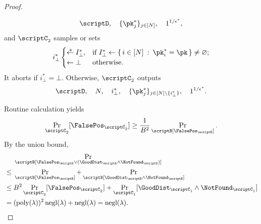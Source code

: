 \begin{proof}
\begin{itemize}
\begin{align*}
\scriptD,\quad
\{\pk_j^\ast\}_{j\in[N]},\quad
1^{1/\epsilon^\ast},
\end{align*}
and $\scriptC_2$ samples or sets
\begin{align*}
i_\bot^\ast\begin{cases}
\draws I_\bot^\ast,&\textup{if }
I_\bot^\ast\gets
\{\,
{i\in[N]}
\::\:
{\pk_i^\ast=\pk}
\,\}\neq\varnothing;\\
\gets\bot&\textup{otherwise}.
\end{cases}
\end{align*}
It aborts if ${i_\bot^\ast=\bot}$.
Otherwise, $\scriptC_2$ outputs
\begin{align*}
\scriptD,\quad
N,\quad
i_\bot^\ast,\quad
\{\pk_j^\ast\}_{j\in{[N]\setminus{\{i_\bot^\ast\}}}},\quad
1^{1/\epsilon^\ast}.
\end{align*}
\end{itemize}
Routine calculation yields
\begin{align*}
\Pr_{\scriptC_2}[\FalsePos_{\scriptC_2}]
\geq\frac{1}{B^2}\Pr_\scriptB[\FalsePos_\scriptB].
\end{align*}
By the union bound,
\begin{align*}
&
\Pr_\scriptB[\FalsePos_\scriptB\vee(\GoodDist_\scriptB\wedge\NotFound_\scriptB)]
\\{}\leq{}&
\Pr_\scriptB[\FalsePos_\scriptB]
+
\Pr_\scriptB[\GoodDist_\scriptB\wedge\NotFound_\scriptB]
\\{}\leq{}&
B^2\Pr_{\scriptC_2}[\FalsePos_{\scriptC_2}]
+
\Pr_{\scriptC_1}[\GoodDist_{\scriptC_1}\wedge\NotFound_{\scriptC_1}]
\WideNarrow{}{\hspace*{-1em}}
\\{}={}&
(\poly(\lambda))^2\negl(\lambda)+\negl(\lambda)
=
\negl(\lambda).
\qedhere
\end{align*}
\end{proof}

